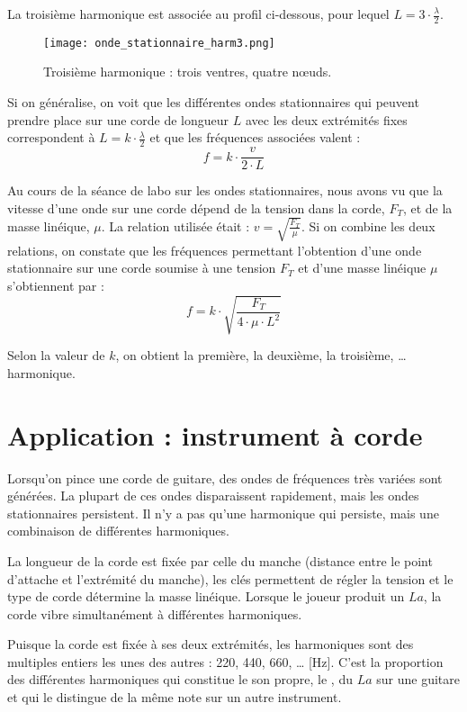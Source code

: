 La troisième harmonique est associée au profil ci-dessous, pour lequel  \(L=3 \cdot \frac{\lambda}{2}\).
\begin{figure}[h!]
    \centering
    \texttt{[image: onde\_stationnaire\_harm3.png]}
    \caption{Troisième harmonique : trois ventres, quatre nœuds.}
\end{figure}

Si on généralise, on voit que les différentes ondes stationnaires qui peuvent prendre place sur une corde de longueur \(L\) avec les deux extrémités fixes correspondent à  \(L=k \cdot \frac{\lambda}{2}\) et que les fréquences associées valent :
\begin{equation}
    f=k \cdot \frac{v}{2 \cdot L}
\end{equation}

Au cours de la séance de labo sur les ondes stationnaires, nous avons vu que la vitesse d'une onde sur une corde dépend de la tension dans la corde, \(F_T\), et de la masse linéique, \(\mu\). La relation utilisée était : \(v=\sqrt{\frac{F_T}{\mu}}\). Si on combine les deux relations, on constate que les fréquences permettant l'obtention d'une onde stationnaire sur une corde soumise à une tension \(F_T\) et d'une masse linéique \(\mu\) s'obtiennent par :
\begin{equation}
    f=k \cdot \sqrt{\frac{F_T}{4\cdot \mu \cdot L^2}}
\end{equation}

Selon la valeur de \(k\), on obtient la première, la deuxième, la troisième, … harmonique.

\newpage

\section{Application : instrument à corde}
Lorsqu'on pince une corde de guitare, des ondes de fréquences très variées sont générées. La plupart de ces ondes disparaissent rapidement, mais les ondes stationnaires persistent. Il n'y a pas qu'une harmonique qui persiste, mais une combinaison de différentes harmoniques.

La longueur de la corde est fixée par celle du manche (distance entre le point d'attache et l'extrémité du manche), les clés permettent de régler la tension et le type de corde détermine la masse linéique.
Lorsque le joueur produit un \(La\), la corde vibre simultanément à différentes harmoniques.

Puisque la corde est fixée à ses deux extrémités, les harmoniques sont des multiples entiers les unes des autres : 220, 440, 660, … [Hz]. C'est la proportion des différentes harmoniques qui constitue le son propre, le , du \(La\) sur une  guitare et qui le distingue de la même note sur un autre instrument.

